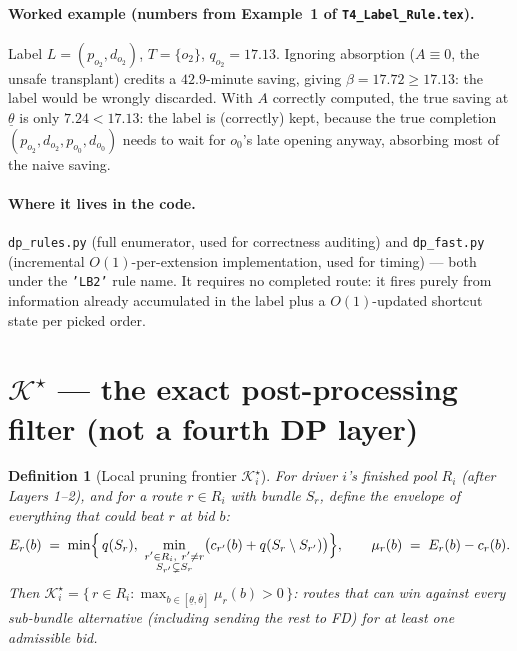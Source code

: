 \documentclass[11pt]{article}
\newtheorem{definition}{Definition}
\newcommand{\Ks}{\mathcal{K}^{\star}}
\newcommand{\thl}{\underline{\theta}}
\newcommand{\thu}{\overline{\theta}}
\begin{document}
\paragraph{Worked example (numbers from Example~1 of \texttt{T4\_Label\_Rule.tex}).} Label
$L=(p_{o_2},d_{o_2})$, $T=\{o_2\}$, $q_{o_2}=17.13$. Ignoring absorption ($A\equiv0$, the
unsafe transplant) credits a $42.9$-minute saving, giving $\beta=17.72\ge17.13$: the label
would be wrongly discarded. With $A$ correctly computed, the true saving at $\thl$ is only
$7.24<17.13$: the label is (correctly) kept, because the true completion
$(p_{o_2},d_{o_2},p_{o_0},d_{o_0})$ needs to wait for $o_0$'s late opening anyway, absorbing
most of the naive saving.

\paragraph{Where it lives in the code.} \texttt{dp\_rules.py} (full enumerator, used for
correctness auditing) and \texttt{dp\_fast.py} (incremental $O(1)$-per-extension
implementation, used for timing) --- both under the \texttt{'LB2'} rule name. It requires no
completed route: it fires purely from information already accumulated in the label plus a
$O(1)$-updated shortcut state per picked order.

\section{$\Ks$ --- the exact post-processing filter (not a fourth DP layer)}

\begin{definition}[Local pruning frontier $\Ks_i$]\label{def:kstar}
For driver $i$'s \emph{finished} pool $R_i$ (after Layers 1--2), and for a route $r\in R_i$
with bundle $S_r$, define the envelope of everything that could beat $r$ at bid $b$:
\[
E_r(b) \;=\; \min\Bigl\{\, q(S_r),\ \min_{\substack{r'\in R_i,\ r'\ne r\\ S_{r'}\subsetneq S_r}}
\bigl(c_{r'}(b) + q(S_r\setminus S_{r'})\bigr) \Bigr\}, \qquad
\mu_r(b) \;=\; E_r(b) - c_r(b).
\]
Then $\Ks_i = \{\, r\in R_i : \max_{b\in[\thl,\thu]}\mu_r(b) > 0 \,\}$: routes that can win
against \emph{every} sub-bundle alternative (including sending the rest to FD) for at least
one admissible bid.
\end{definition}
\end{document}

